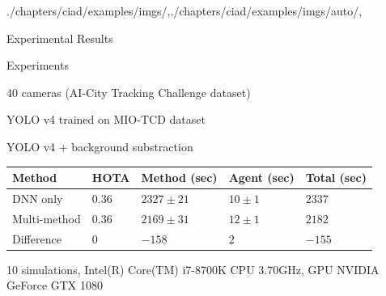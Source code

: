 \begin{graphicspathcontext}{{./chapters/ciad/examples/imgs/},{./chapters/ciad/examples/imgs/auto/},\old}

\begin{frame}{Experimental Results}
	\begin{block}{Experiments}
		\begin{description}
			\item 40 cameras (AI-City Tracking Challenge dataset)
			\item[Mono-method] YOLO v4 trained on MIO-TCD dataset
			\item[Multi-method] YOLO v4 + background substraction
		\end{description}
	\end{block}
	\vspace{.5cm}
	\begin{tabularx}{\linewidth}{X|X|X|X|X}
		\hline
		\textbf{Method} & \textbf{HOTA} & \textbf{Method (sec)} & \textbf{Agent (sec)} & \textbf{Total (sec)} \\
		\hline\hline
		DNN only & $0.36$ & $2327 \pm 21$ & $10 \pm 1$ & $2337$ \\
		\hline
		Multi-method & $0.36$ & $2169 \pm 31$ & $12 \pm 1$ & $2182$ \\
		\hline\hline
		Difference & $0$ & $-158$ & $2$ & $-155$ \\
		\hline
	\end{tabularx}
	\begin{center}
		{\small 10 simulations, Intel(R) Core(TM) i7-8700K CPU 3.70GHz, GPU NVIDIA GeForce GTX 1080}
	\end{center}
\end{frame}

\end{graphicspathcontext}

\endinput
